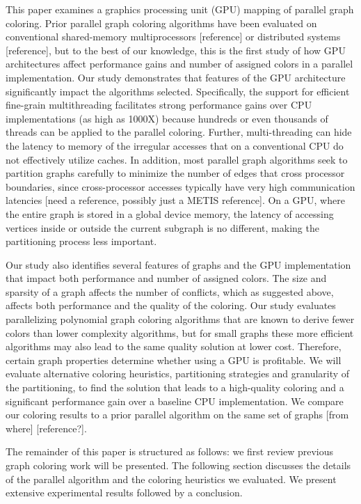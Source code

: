 \documentclass[preprint]{sigplanconf}
\begin{document}
This paper examines a graphics processing unit (GPU) mapping of parallel graph coloring.  Prior parallel graph coloring algorithms have been evaluated on conventional shared-memory multiprocessors [reference] or distributed systems [reference], but to the best of our knowledge, this is the first study of how GPU architectures affect performance gains and number of assigned colors in a parallel implementation.  Our study demonstrates that features of the GPU architecture significantly impact the algorithms selected.  Specifically, the support for efficient fine-grain multithreading facilitates strong performance gains over CPU implementations (as high as 1000X) because hundreds or even thousands of threads can be applied to the parallel coloring.  Further, multi-threading can hide the latency to memory of the irregular accesses that on a conventional CPU do not effectively utilize caches.  In addition, most parallel graph algorithms seek to partition graphs carefully to minimize the number of edges that cross processor boundaries, since cross-processor accesses typically have very high communication latencies [need a reference, possibly just a METIS reference].  On a GPU, where the entire graph is stored in a global device memory, the latency of accessing vertices inside or outside the current subgraph is no different, making the partitioning process less important. 

Our study also identifies several features of graphs and the GPU implementation that impact both performance and number of assigned colors.  The size and sparsity of a graph affects the number of conflicts, which as suggested above, affects both performance and the quality of the coloring.  Our study evaluates parallelizing polynomial graph coloring algorithms that are known to derive fewer colors than lower complexity algorithms, but for small graphs these more efficient algorithms may also lead to the same quality solution at lower cost.  Therefore, certain graph properties determine whether using a GPU is profitable.  We will evaluate alternative coloring heuristics, partitioning strategies and granularity of the partitioning, to find the solution that leads to a high-quality coloring and a significant performance gain over a baseline CPU implementation.  We compare our coloring results to a prior parallel algorithm on the same set of graphs [from where] [reference?].

The remainder of this paper is structured as follows: we first review previous graph coloring work will be presented.  The following section discusses the details of the parallel algorithm and the coloring heuristics we evaluated.  We present extensive experimental results followed by a conclusion.
\end{document}
